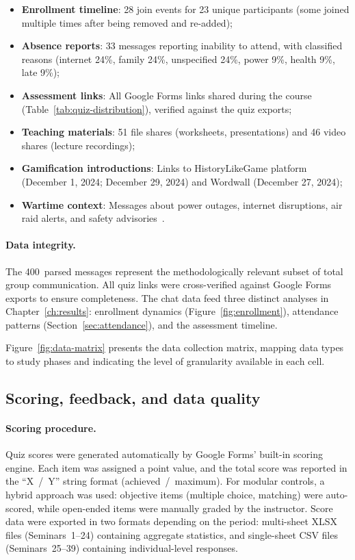 \begin{itemize}
\item \textbf{Enrollment timeline}: 28 join events for 23 unique participants (some joined multiple times after being removed and re-added);
\item \textbf{Absence reports}: 33 messages reporting inability to attend, with classified reasons (internet 24\%, family 24\%, unspecified 24\%, power 9\%, health 9\%, late 9\%);
\item \textbf{Assessment links}: All Google Forms links shared during the course (Table~\ref{tab:quiz-distribution}), verified against the quiz exports;
\item \textbf{Teaching materials}: 51 file shares (worksheets, presentations) and 46 video shares (lecture recordings);
\item \textbf{Gamification introductions}: Links to HistoryLikeGame platform (December 1, 2024; December 29, 2024) and Wordwall (December 27, 2024);
\item \textbf{Wartime context}: Messages about power outages, internet disruptions, air raid alerts, and safety advisories~\cite{Martynets202428, UNESCO2023}.
\end{itemize}

\paragraph{Data integrity.}
The 400~parsed messages represent the methodologically relevant subset of total group communication. All quiz links were cross-verified against Google Forms exports to ensure completeness. The chat data feed three distinct analyses in Chapter~\ref{ch:results}: enrollment dynamics (Figure~\ref{fig:enrollment}), attendance patterns (Section~\ref{sec:attendance}), and the assessment timeline.

Figure~\ref{fig:data-matrix} presents the data collection matrix, mapping data types to study phases and indicating the level of granularity available in each cell.


\subsection{Scoring, feedback, and data quality} \label{sec:scoring}

\paragraph{Scoring procedure.}
Quiz scores were generated automatically by Google Forms' built-in scoring engine. Each item was assigned a point value, and the total score was reported in the ``X~/~Y'' string format (achieved~/~maximum). For modular controls, a hybrid approach was used: objective items (multiple choice, matching) were auto-scored, while open-ended items were manually graded by the instructor. Score data were exported in two formats depending on the period: multi-sheet XLSX files (Seminars~1--24) containing aggregate statistics, and single-sheet CSV files (Seminars~25--39) containing individual-level responses.


